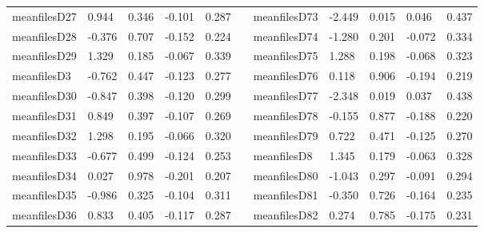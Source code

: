 \begin{table}[h!]
\begin{tabular}{lllllllllll}
meanfilesD27  & 0.944            & 0.346            & -0.101              & 0.287               &           & meanfilesD73  & -2.449           & 0.015            & 0.046               & 0.437               \\
meanfilesD28  & -0.376           & 0.707            & -0.152              & 0.224               &           & meanfilesD74  & -1.280           & 0.201            & -0.072              & 0.334               \\
meanfilesD29  & 1.329            & 0.185            & -0.067              & 0.339               &           & meanfilesD75  & 1.288            & 0.198            & -0.068              & 0.323               \\
meanfilesD3   & -0.762           & 0.447            & -0.123              & 0.277               &           & meanfilesD76  & 0.118            & 0.906            & -0.194              & 0.219               \\
meanfilesD30  & -0.847           & 0.398            & -0.120              & 0.299               &           & meanfilesD77  & -2.348           & 0.019            & 0.037               & 0.438               \\
meanfilesD31  & 0.849            & 0.397            & -0.107              & 0.269               &           & meanfilesD78  & -0.155           & 0.877            & -0.188              & 0.220               \\
meanfilesD32  & 1.298            & 0.195            & -0.066              & 0.320               &           & meanfilesD79  & 0.722            & 0.471            & -0.125              & 0.270               \\
meanfilesD33  & -0.677           & 0.499            & -0.124              & 0.253               &           & meanfilesD8   & 1.345            & 0.179            & -0.063              & 0.328               \\
meanfilesD34  & 0.027            & 0.978            & -0.201              & 0.207               &           & meanfilesD80  & -1.043           & 0.297            & -0.091              & 0.294               \\
meanfilesD35  & -0.986           & 0.325            & -0.104              & 0.311               &           & meanfilesD81  & -0.350           & 0.726            & -0.164              & 0.235               \\
meanfilesD36  & 0.833            & 0.405            & -0.117              & 0.287               &           & meanfilesD82  & 0.274            & 0.785            & -0.175              & 0.231               \\

\end{tabular}
\end{table}
